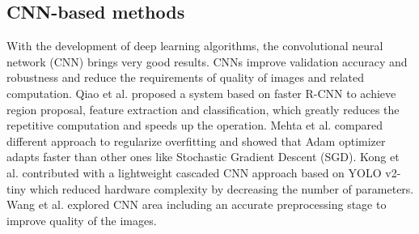 \subsection{CNN-based methods}
With the development of deep learning algorithms, the convolutional neural network (CNN) brings very good results. CNNs improve validation accuracy and robustness and reduce the requirements of quality of images and related computation. Qiao et al. \cite{qiaoCNN} proposed a system based on faster R-CNN to achieve region proposal, feature extraction and classification, which greatly reduces the repetitive computation and speeds up the operation. Mehta et al. \cite{mehtaCNN} compared different approach to regularize overfitting and showed that Adam optimizer adapts faster than other ones like Stochastic Gradient Descent (SGD). Kong et al. \cite{kongCNN} contributed with a lightweight cascaded CNN approach based on YOLO v2-tiny which reduced hardware complexity by decreasing the number of parameters.
Wang et al. \cite{wangCNN} explored CNN area including an accurate preprocessing stage to improve quality of the images.

